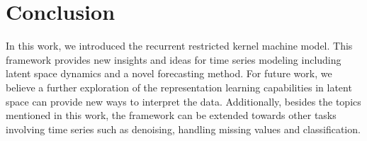 \section{Conclusion}
In this work, we introduced the recurrent restricted kernel machine model. This framework provides new insights and ideas for time series modeling including latent space dynamics and a novel forecasting method. For future work, we believe a further exploration of the representation learning capabilities in latent space can provide new ways to interpret the data. Additionally, besides the topics mentioned in this work, the framework can be extended towards other tasks involving time series such as denoising, handling missing values and classification.